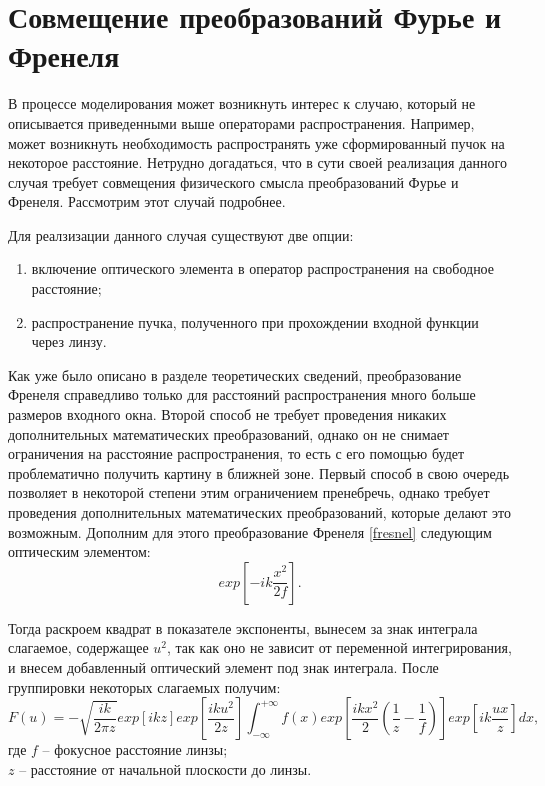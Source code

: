	\newpage
	\section{Совмещение преобразований Фурье и Френеля}{
	В процессе моделирования может возникнуть интерес к случаю, который не описывается приведенными выше операторами распространения. Например, может возникнуть необходимость распространять уже сформированный пучок на некоторое расстояние. Нетрудно догадаться, что в сути своей реализация данного случая требует совмещения физического смысла преобразований Фурье и Френеля. Рассмотрим этот случай подробнее.

	 Для реалзизации данного случая существуют две опции:
	\begin{enumerate}[\arabic*)] 
	\item включение оптического элемента в оператор распространения на свободное расстояние;
	\item распространение пучка, полученного при прохождении входной функции через линзу.
	\end{enumerate}
	
	Как уже было описано в разделе теоретических сведений, преобразование Френеля справедливо только для расстояний распространения много больше размеров входного окна. Второй способ не требует проведения никаких дополнительных математических преобразований, однако он не снимает ограничения на расстояние распространения, то есть с его помощью будет проблематично получить картину в ближней зоне. Первый способ в свою очередь позволяет в некоторой степени этим ограничением пренебречь, однако требует проведения дополнительных математических преобразований, которые делают это возможным. Дополним для этого преобразование Френеля \eqref{fresnel} следующим оптическим элементом:
	\begin{equation*}
	exp[-ik \frac{x^2}{2f} ].
	\end{equation*}
	
	Тогда раскроем квадрат в показателе экспоненты, вынесем за знак интеграла слагаемое, содержащее $u^2$, так как оно не зависит от переменной интегрирования, и внесем добавленный оптический элемент под знак интеграла. После группировки некоторых слагаемых получим:
	\begin{equation*}
	F(u) = - \sqrt{\frac{ik}{2 \pi z}}exp[ikz] exp[{ \frac{iku^2}{2z} }] \int_{-\infty}^{+\infty}f(x) exp[\frac{ikx^2}{2}( \frac{1}{z} - \frac{1}{f})] exp[{ik \frac{ux}{z}}]dx,
	\end{equation*}
	\tab где $f$ -- фокусное расстояние линзы;\\
	\tab \tab \hspace{-0.4cm}$z$ -- расстояние от начальной плоскости до  линзы.
	
}
